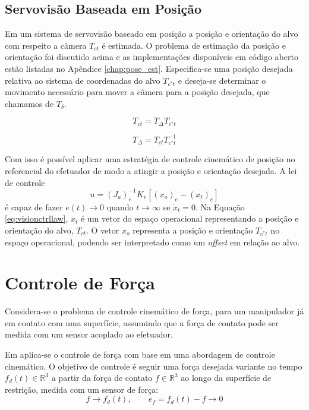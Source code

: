 
\subsection{Servovisão Baseada em Posição}
Em um sistema de servovisão baseado em posição a posição e orientação do alvo com respeito a câmera ${T}_{ct}$ é estimada. O problema de estimação da posição e orientação foi discutido acima e as implementações disponíveis em código aberto estão listadas no Apêndice \ref{chap:pose_est}.
Especifica-se uma posição desejada relativa ao sistema de coordenadas do alvo  ${T}_{c^*t}$ e deseja-se determinar o movimento necessário para mover a câmera para a posição desejada, que chamamos de ${T}_\delta$.

\begin{equation}
 {T}_{ct} =  {T}_\Delta {T}_{c^*t}
\end{equation}

\begin{equation}
 {T}_\Delta  =   {T}_{ct} {T}_{c^*t}^{-1}
\end{equation}

Com isso é possível aplicar uma estratégia de controle cinemático de posição no referencial do efetuador de modo a atingir a posição e orientação desejada. A lei de controle
\begin{equation} \label{eq:visionctrllaw}
{u} = ({J}_a)_e^{-1}{K}_v[({x}_o)_e - ({x}_t)_e]
\end{equation}
é capaz de fazer ${e}(t) \rightarrow 0$ quando $t \rightarrow \infty$ se $\dot{{x}}_t = 0$. Na Equação \eqref{eq:visionctrllaw}, ${x}_t$ é um vetor do espaço operacional representando a posição e orientação do alvo, ${T}_{ct}$. O vetor $x_o$ representa a posição e orientação ${T}_{c^*t}$ no espaço operacional, podendo ser interpretado como um \textit{offset} em relação ao alvo.

\section{Controle de Força}
Considera-se o problema de controle cinemático de força, para um manipulador já em contato com uma superfície, assumindo que a força de contato pode ser medida com um sensor acoplado ao efetuador. 

Em \citep{leite2011servo} aplica-se o controle de força com base em uma abordagem de controle cinemático. O objetivo de controle é seguir uma força desejada variante no tempo ${f}_d(t) \in \mathbb{R}^3$ a partir da força de contato ${f} \in \mathbb{R}^3$ ao longo da superfície de restrição, medida com um sensor de força:
\begin{equation} \label{eq:problema_ctrl_forca}
{f} \rightarrow {f}_d(t), \qquad {e}_f = {f}_d(t) - {f} \rightarrow 0
\end{equation}

